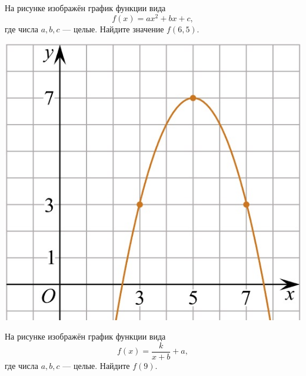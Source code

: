 \begin{class}[number=5]
	\begin{listofex}
		\item
		\begin{minipage}[t]{\bodywidth}
			На рисунке изображён график функции вида \[ f(x)=ax^2+bx+c, \] где числа \(a, b, c\) --- целые. Найдите значение \(f(6,5)\).
		\end{minipage}
		\hspace{0.05\linewidth}
		\begin{minipage}[t]{\picwidth}
			\includegraphics[align=t, width=\textwidth]{pics/G101M4H2-5.jpg}
		\end{minipage}
		\item
		\begin{minipage}[t]{\bodywidth}
			На рисунке изображён график функции вида \[ f(x)=\dfrac{k}{x+b}+a, \] где числа \(a, b, c\) --- целые. Найдите \(f(9)\).
		\end{minipage}
		\hspace{0.05\linewidth}
		\begin{minipage}[t]{\picwidth}

\end{minipage}
\end{listofex}
\end{class}
